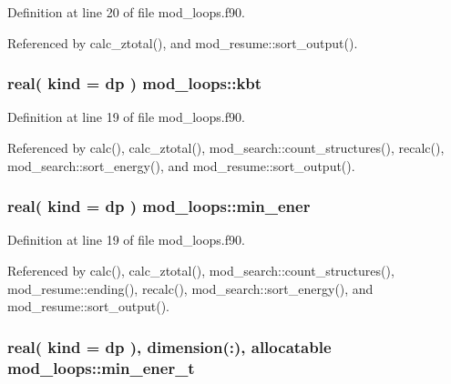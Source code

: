 Definition at line 20 of file mod\+\_\+loops.\+f90.



Referenced by calc\+\_\+ztotal(), and mod\+\_\+resume\+::sort\+\_\+output().

\subsubsection[{\texorpdfstring{kbt}{kbt}}]{\setlength{\rightskip}{0pt plus 5cm}real( kind = dp ) mod\+\_\+loops\+::kbt}\hypertarget{namespacemod__loops_a28f32cc48dca88b5eb914f3b51ff36c4}{}\label{namespacemod__loops_a28f32cc48dca88b5eb914f3b51ff36c4}


Definition at line 19 of file mod\+\_\+loops.\+f90.



Referenced by calc(), calc\+\_\+ztotal(), mod\+\_\+search\+::count\+\_\+structures(), recalc(), mod\+\_\+search\+::sort\+\_\+energy(), and mod\+\_\+resume\+::sort\+\_\+output().

\subsubsection[{\texorpdfstring{min\+\_\+ener}{min_ener}}]{\setlength{\rightskip}{0pt plus 5cm}real( kind = dp ) mod\+\_\+loops\+::min\+\_\+ener}\hypertarget{namespacemod__loops_a17eba688dba567d251d70c4c22d9a1cb}{}\label{namespacemod__loops_a17eba688dba567d251d70c4c22d9a1cb}


Definition at line 19 of file mod\+\_\+loops.\+f90.



Referenced by calc(), calc\+\_\+ztotal(), mod\+\_\+search\+::count\+\_\+structures(), mod\+\_\+resume\+::ending(), recalc(), mod\+\_\+search\+::sort\+\_\+energy(), and mod\+\_\+resume\+::sort\+\_\+output().

\subsubsection[{\texorpdfstring{min\+\_\+ener\+\_\+t}{min_ener_t}}]{\setlength{\rightskip}{0pt plus 5cm}real( kind = dp ), dimension(\+:), allocatable mod\+\_\+loops\+::min\+\_\+ener\+\_\+t}\hypertarget{namespacemod__loops_a285da08b33e0b132d883ee82f39f6ea2}{}\label{namespacemod__loops_a285da08b33e0b132d883ee82f39f6ea2}


